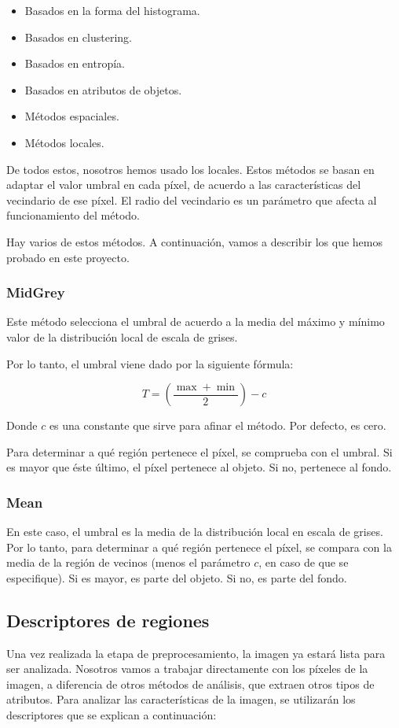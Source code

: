 \begin{itemize}
\item Basados en la forma del histograma.
\item Basados en clustering.
\item Basados en entropía.
\item Basados en atributos de objetos.
\item Métodos espaciales.
\item Métodos locales.
\end{itemize}

De todos estos, nosotros hemos usado los locales. Estos métodos se basan en adaptar el valor umbral en cada píxel, de acuerdo a las características del vecindario de ese píxel. El radio del vecindario es un parámetro que afecta al funcionamiento del método.

Hay varios de estos métodos. A continuación, vamos a describir los que hemos probado en este proyecto.

\subsubsection{MidGrey}
Este método selecciona el umbral de acuerdo a la media del máximo y mínimo valor de la distribución local de escala de grises.

Por lo tanto, el umbral viene dado por la siguiente fórmula:

\[T = \left(\frac{\max+\min}{2}\right)-c\]

Donde $c$ es una constante que sirve para afinar el método. Por defecto, es cero.

Para determinar a qué región pertenece el píxel, se comprueba con el umbral. Si es mayor que éste último, el píxel pertenece al objeto. Si no, pertenece al fondo.

\subsubsection{Mean}
En este caso, el umbral es la media de la distribución local en escala de grises. Por lo tanto, para determinar a qué región pertenece el píxel, se compara con la media de la región de vecinos (menos el parámetro $c$, en caso de que se especifique). Si es mayor, es parte del objeto. Si no, es parte del fondo.


\subsection{Descriptores de regiones}\label{descriptores}
Una vez realizada la etapa de preprocesamiento, la imagen ya estará lista para ser analizada.
Nosotros vamos a trabajar directamente con los píxeles de la imagen, a diferencia de otros métodos de análisis, que extraen otros tipos de atributos. Para analizar las características de la imagen, se utilizarán los descriptores que se explican a continuación:

